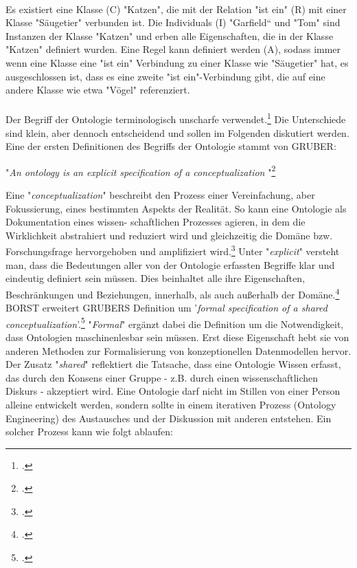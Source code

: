 \documentclass[12pt,a4paper]{article}
\begin{document}
\\
Es existiert eine Klasse (C) "Katzen", die mit der Relation "ist ein" (R) mit einer Klasse "Säugetier" verbunden ist.  Die Individuals (I) "Garfield“ und "Tom" sind Instanzen der Klasse "Katzen" und erben alle Eigenschaften, die in der Klasse "Katzen" definiert wurden. Eine Regel kann definiert werden (A), sodass immer wenn eine Klasse eine "ist ein" Verbindung zu einer Klasse wie "Säugetier" hat, es ausgeschlossen ist, dass es eine zweite "ist ein"-Verbindung  gibt, die auf eine andere Klasse wie etwa "Vögel" referenziert. 
\\
\\
Der Begriff der Ontologie terminologisch unscharfe verwendet.\footcite[Vgl.][S.1]{gruber1993translation} Die Unterschiede sind klein, aber dennoch entscheidend und sollen im Folgenden diskutiert werden.
Eine der  ersten  Definitionen des Begriffs der Ontologie stammt von GRUBER: 
\begin{center}
 "\textit{An ontology is    an    explicit    specification    of    a conceptualization}
"\footcite[][S.69]{hoekstra2009ontology}
\end{center}
Eine "\textit{conceptualization}" beschreibt den Prozess einer Vereinfachung, aber Fokussierung, eines bestimmten Aspekts der Realität. 
So kann eine Ontologie als Dokumentation eines 
wissen- schaftlichen 
Prozesses agieren, in dem die Wirklichkeit abstrahiert und reduziert wird und gleichzeitig die Domäne bzw. Forschungsfrage hervorgehoben und amplifiziert wird.\footcite[Vgl.][]{thaller2017ungefahre}
Unter "\textit{explicit}" versteht man, dass die Bedeutungen aller von der Ontologie erfassten Begriffe klar und eindeutig definiert sein müssen. Dies beinhaltet alle ihre Eigenschaften, Beschränkungen und Beziehungen, innerhalb, als auch außerhalb der Domäne.\footcite{sure2003methodology}
BORST erweitert GRUBERS Definition um  '\textit{formal  specification  of  a shared  conceptualization}'.\footcite{borst1997construction}
"\textit{Formal}" ergänzt dabei die Definition um die Notwendigkeit, dass Ontologien maschinenlesbar sein müssen. Erst diese Eigenschaft hebt sie von anderen Methoden zur Formalisierung von konzeptionellen Datenmodellen hervor. Der Zusatz "\textit{shared}" reflektiert die Tatsache, dass eine Ontologie Wissen erfasst, das durch den Konsens einer Gruppe - z.B. durch einen wissenschaftlichen  Diskurs - akzeptiert wird. Eine Ontologie darf nicht im Stillen von einer Person alleine entwickelt werden, sondern sollte in einem iterativen Prozess (Ontology Engineering) des Austausches und der Diskussion mit anderen entstehen. Ein solcher Prozess kann wie folgt ablaufen:
\end{document}
